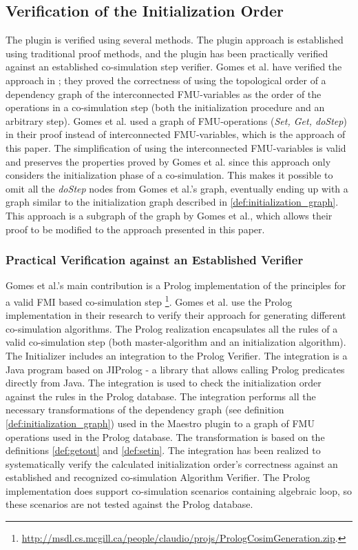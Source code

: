 \subsection{Verification of the Initialization Order}
The plugin is verified using several methods. The plugin approach is established using traditional proof methods, and the plugin has been practically verified against an established co-simulation step verifier. Gomes et al. have verified the approach in \cite{gomes_lucio_vangheluwe_2019}; they proved the correctness of using the topological order of a dependency graph of the interconnected FMU-variables as the order of the operations in a co-simulation step (both the initialization procedure and an arbitrary step). Gomes et al. \cite{gomes_lucio_vangheluwe_2019} used a graph of FMU-operations (\textit{Set, Get, doStep}) in their proof instead of interconnected FMU-variables, which is the approach of this paper. The simplification of using the interconnected FMU-variables is valid and preserves the properties proved by Gomes et al. since this approach only considers the initialization phase of a co-simulation. This makes it possible to omit all the \textit{doStep} nodes from Gomes et al.'s graph, eventually ending up with a graph similar to the initialization graph described in \cref{def:initialization_graph}. 
This approach is a subgraph of the graph by Gomes et al.\cite{gomes_lucio_vangheluwe_2019}, which allows their proof to be modified to the approach presented in this paper.

\subsubsection{Practical Verification against an Established Verifier} 
Gomes et al.'s \cite{gomes_lucio_vangheluwe_2019} main contribution is a Prolog implementation of the principles for a valid FMI based co-simulation step \footnote{\url{http://msdl.cs.mcgill.ca/people/claudio/projs/PrologCosimGeneration.zip}.}. Gomes et al. use the Prolog implementation in their research to verify their approach for generating different co-simulation algorithms. The Prolog realization encapsulates all the rules of a valid co-simulation step (both master-algorithm and an initialization algorithm). 
The Initializer includes an integration to the Prolog Verifier. The integration is a Java program based on JIProlog \cite{JIProlog} - a library that allows calling Prolog predicates directly from Java. The integration is used to check the initialization order against the rules in the Prolog database. The integration performs all the necessary transformations of the dependency graph (see definition \ref{def:initialization_graph}) used in the Maestro plugin to a graph of FMU operations used in the Prolog database. The transformation is based on the definitions \ref{def:getout} and \ref{def:setin}. The integration has been realized to systematically verify the calculated initialization order's correctness against an established and recognized co-simulation Algorithm Verifier. 
The Prolog implementation does support co-simulation scenarios containing algebraic loop, so these scenarios are not tested against the Prolog database.
